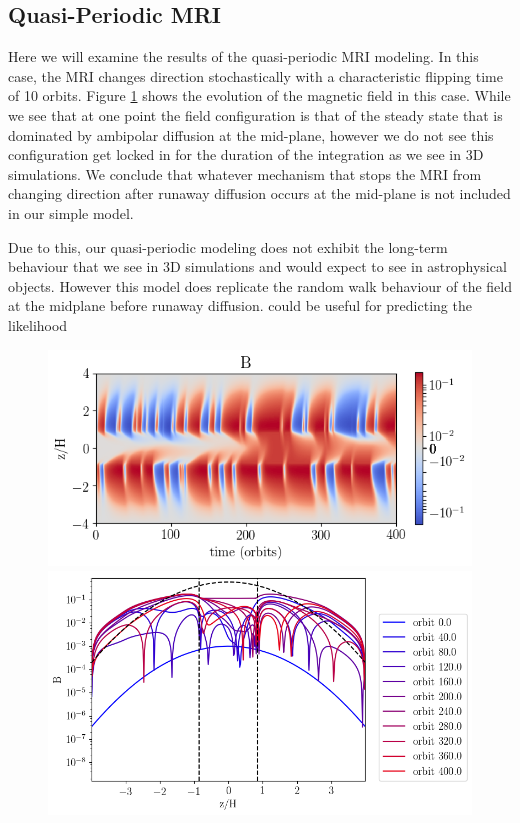 \subsection{Quasi-Periodic MRI}
Here we will examine the results of the quasi-periodic MRI modeling.  In this case, the MRI changes direction stochastically with a characteristic flipping time of 10 orbits.  Figure \ref{figRandomMri} shows the evolution of the magnetic field in this case.  While we see that at one point the field configuration is that of the steady state that is dominated by ambipolar diffusion at the mid-plane, however we do not see this configuration get locked in for the duration of the integration as we see in 3D simulations.  We conclude that whatever mechanism that stops the MRI from changing direction after runaway diffusion occurs at the mid-plane is not included in our simple model.  

Due to this, our quasi-periodic modeling does not exhibit the long-term behaviour that we see in 3D simulations and would expect to see in astrophysical objects.  However this model does replicate the random walk behaviour of the field at the midplane before runaway diffusion. could be useful for predicting the likelihood 

\begin{figure}[h!]
\centering
\includegraphics[width=0.6\columnwidth]{figs/figsChapter5/noSC_AD_randomMRI/B_ST2.png}
\includegraphics[width=0.8\columnwidth]{figs/figsChapter5/noSC_AD_randomMRI/B.png}
\caption{ }
\label{figRandomMri}
\end{figure}






